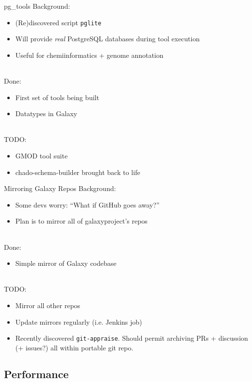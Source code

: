 \documentclass[12pt]{ufrslides}
\begin{document}
	\begin{frame}{pg\_tools}
		Background:
		\begin{itemize}
			\item (Re)discovered script \texttt{pglite}
			\item Will provide \emph{real} PostgreSQL databases during tool execution
			\item Useful for chemiinformatics + genome annotation
		\end{itemize}
		\ \\[0.5cm]
		Done:
		\begin{itemize}
			\item First set of tools being built
			\item Datatypes in Galaxy
		\end{itemize}
		\ \\[0.5cm]
		TODO:
		\begin{itemize}
			\item GMOD tool suite
			\item chado-schema-builder brought back to life
		\end{itemize}
	\end{frame}

	\begin{frame}{Mirroring Galaxy Repos}
		Background:
		\begin{itemize}
			\item Some devs worry: ``What if GitHub goes away?''
			\item Plan is to mirror all of galaxyproject's repos
		\end{itemize}
		\ \\[0.5cm]
		Done:
		\begin{itemize}
			\item Simple mirror of Galaxy codebase
		\end{itemize}
		\ \\[0.5cm]
		TODO:
		\begin{itemize}
			\item Mirror all other repos
			\item Update mirrors regularly (i.e. Jenkins job)
			\item Recently discovered \texttt{git-appraise}. Should permit archiving PRs + discussion (+ issues?) all within portable git repo.
		\end{itemize}
	\end{frame}

\subsection{Performance}
\end{document}
